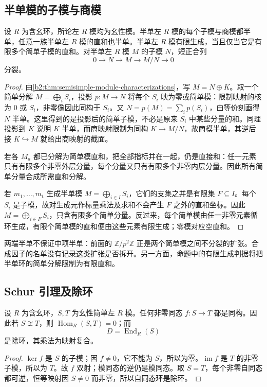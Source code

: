 \subsection{半单模的子模与商模}
\label{b2:subsec:1301:02}

\begin{proposition}\label{b2:prop:semisimple-subquotients}
	设 \(R\) 为含幺环，所论左 \(R\) 模均为幺性模。半单左 \(R\) 模的每个子模与商模都半单，任意一族半单左 \(R\) 模的直和也半单。半单左 \(R\) 模有限生成，当且仅当它是有限多个简单子模的直和。对半单左 \(R\) 模 \(M\) 的子模 \(N\)，短正合列
	\[
		0\longrightarrow N\longrightarrow M\longrightarrow M/N\longrightarrow0
	\]
	分裂。
\end{proposition}
\begin{proof}
	由\cref{b2:thm:semisimple-module-characterizations}，写 \(M=N\oplus K\)。取一个简单分解 \(M=\bigoplus_iS_i\)，投影 \(p:M\to N\) 将每个 \(S_i\) 映为零或简单模：限制映射的核为 \(0\) 或 \(S_i\)，非零像因此同构于 \(S_i\)。又 \(N=p(M)=\sum_i p(S_i)\)，由等价刻画得 \(N\) 半单。这里得到的是投影后的简单子模，不必是原来 \(S_i\) 中某些分量的和。同理投影到 \(K\) 说明 \(K\) 半单，而商映射限制为同构 \(K\to M/N\)，故商模半单，其逆后接 \(K\hookrightarrow M\) 就给出商映射的截面。

	若各 \(M_a\) 都已分解为简单模直和，把全部指标并在一起，仍是直接和：任一元素只有有限多个非零外层分量，每个分量又只有有限多个非零内层分量。因此所有简单分量合成所需直和分解。

	若 \(m_1,\ldots,m_t\) 生成半单模 \(M=\bigoplus_{i\in I}S_i\)，它们的支集之并是有限集 \(F\subseteq I\)。每个 \(S_i\) 是子模，故对生成元作标量乘法及求和不会产生 \(F\) 之外的直和坐标。因此 \(M=\bigoplus_{i\in F}S_i\)，只含有限多个简单分量。反过来，每个简单模由任一非零元素循环生成，有限个简单模的直和便由这些元素有限生成；零模对应空直和。
\end{proof}

两端半单不保证中项半单：前面的 \(\mathbb Z/p^2\mathbb Z\) 正是两个简单模之间不分裂的扩张。合成因子的名单没有记录这类扩张是否拆开。另一方面，命题中的有限生成判据将把半单环的简单分解限制为有限直和。

\subsection{Schur 引理及除环}
\label{b2:subsec:1301:03}

\begin{lemma}[Schur]\label{b2:lem:schur}
	设 \(R\) 为含幺环，\(S,T\) 为幺性简单左 \(R\) 模。任何非零同态 \(f:S\to T\) 都是同构。因此若 \(S\not\cong T\)，则 \(\operatorname{Hom}_R(S,T)=0\)；而
	\[
		D=\operatorname{End}_R(S)
	\]
	是除环，其乘法为映射复合。
\end{lemma}
\begin{proof}
	\(\ker f\) 是 \(S\) 的子模；因 \(f\ne0\)，它不能为 \(S\)，所以为零。\(\operatorname{im}f\) 是 \(T\) 的非零子模，所以为 \(T\)。故 \(f\) 双射；模同态的逆仍是模同态。取 \(S=T\)，每个非零自同态都可逆，恒等映射因 \(S\ne0\) 而非零，所以自同态环是除环。
\end{proof}

